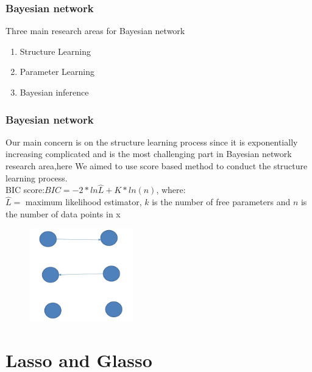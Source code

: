 \documentclass{beamer}
\begin{document}
\begin{frame}
\frametitle{Bayesian network}

Three main research areas for Bayesian network\\
\begin{enumerate}
  \item {\color{red}Structure Learning}
  \item Parameter Learning
  \item Bayesian inference
\end{enumerate}

\end{frame}
\begin{frame}

\frametitle{Bayesian network}
Our main concern is on the structure learning process since it is exponentially increasing complicated and is the most challenging part in Bayesian network research area,here We aimed to use score based method to conduct the structure learning process.\\
\vspace{2ex}
BIC score:$BIC=-2*ln\hat{L}+K*ln(n)$, where:\\
\vspace{2ex}
$\hat{L}=$ maximum likelihood estimator, $k$ is the number of free parameters and $n$ is the number of data points in x
 \begin{figure}
     \includegraphics[width=0.4\textwidth, height=0.4\textheight]{learning.jpg}

    \end{figure}


\end{frame}

\section{Lasso and Glasso}
\end{document}
